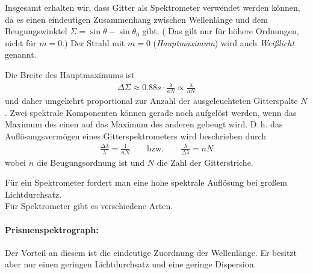\begin{enumerate}[a)]
Insgesamt erhalten wir, dass Gitter als Spektrometer verwendet werden
können, da es einen eindeutigen Zusammenhang zwischen Wellenlänge und
dem Beugungswinktel $\Sigma = \sin\theta-\sin\theta_0$ gibt.
( Das gilt nur für höhere Ordnungen, nicht für $m=0$.)
Der Strahl mit $m=0$ (\emph{Hauptmaximum}) wird
auch \emph{Weißlicht} genannt.

Die Breite des Hauptmaximums ist
\begin{gather*}
  \Delta\Sigma 
  \approx \num{0,88}s\cdot \frac{\lambda}{aN} 
  \propto \frac{\lambda}{aN} 
\end{gather*}
und daher umgekehrt proportional zur Anzahl der ausgeleuchteten
Gitterspalte $N$.
Zwei spektrale Komponenten können gerade noch aufgelöst werden, wenn
das Maximum des einen auf das Maximum des anderen gebeugt wird.
D.\,h. das Auflösungsvermögen eines Gitterspektrometers wird
beschrieben durch
\begin{gather*}
  \frac{\Delta\lambda}{\lambda} = \frac{1}{nN}
  \qquad\text{bzw.}\qquad
  \frac{\lambda}{\Delta\lambda} = nN
\end{gather*}
wobei $n$ die Beugungsordnung ist 
und $N$ die Zahl der Gitterstriche.

\end{enumerate}

Für ein Spektrometer fordert man eine hohe spektrale Auflösung bei großem Lichtdurchsatz.\\
Für Spektrometer gibt es verschiedene Arten.\\
\paragraph{Prismenspektrograph:} Der Vorteil an diesem ist die eindeutige Zuordnung der Wellenlänge. Er besitzt aber nur einen geringen Lichtdurchsatz und eine geringe Dispersion.\\
